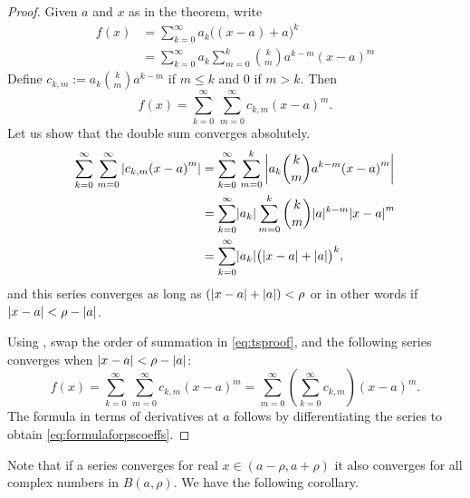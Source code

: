 \begin{proof}
Given $a$ and $x$ as in the theorem,
write
\begin{equation*}
\begin{split}
f(x) &= \sum_{k=0}^\infty a_k {\bigl((x-a)+a\bigr)}^k \\
&= \sum_{k=0}^\infty a_k \sum_{m=0}^k \binom{k}{m} a^{k-m} {(x-a)}^m %
\end{split}
\end{equation*}
Define $c_{k,m} := a_k \binom{k}{m} a^{k-m}$ if $m \leq k$ and $0$ if $m >
k$.  Then 
\begin{equation} \label{eq:tsproof}
f(x) = \sum_{k=0}^\infty \, \sum_{m=0}^\infty c_{k,m} {(x-a)}^m .
\end{equation}
Let us show that the double sum converges absolutely.
\begin{equation*}
\begin{split}
\sum_{k=0}^\infty \, \sum_{m=0}^\infty \left\lvert { c_{k,m} {(x-a)}^m} \right\rvert
& = \sum_{k=0}^\infty \, \sum_{m=0}^k \left\lvert { a_k \binom{k}{m} a^{k-m} {(x-a)}^m } \right\rvert
\\
& = \sum_{k=0}^\infty \lvert {a_k} \rvert \sum_{m=0}^k \binom{k}{m} \lvert {a} \rvert^{k-m}
{\lvert {x-a} \rvert}^m  \\
& = \sum_{k=0}^\infty \lvert {a_k} \rvert {\bigl(\lvert {x-a} \rvert+\lvert {a} \rvert\bigr)}^k ,
\end{split}
\end{equation*}
and this series converges as long as 
$(\lvert {x-a} \rvert+\lvert {a} \rvert) < \rho$ or in other words if
$\lvert {x-a} \rvert < \rho-\lvert {a} \rvert$.

Using ,
swap the order of summation in \eqref{eq:tsproof}, and 
the following series converges when $\lvert {x-a} \rvert < \rho-\lvert {a} \rvert$:
\begin{equation*}
f(x) =
\sum_{k=0}^\infty \, \sum_{m=0}^\infty c_{k,m} {(x-a)}^m
=
\sum_{m=0}^\infty
\left( \sum_{k=0}^\infty
c_{k,m} \right) {(x-a)}^m .
\end{equation*}
The formula in terms of derivatives at $a$ follows by
differentiating the series to obtain \eqref{eq:formulaforpscoeffs}.
\end{proof}

Note that if a series converges for real $x \in (a-\rho,a+\rho)$ it also converges
for all complex numbers in $B(a,\rho)$.
We have the following corollary.

